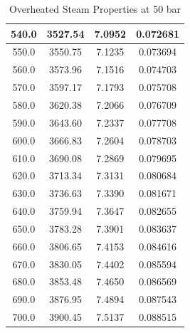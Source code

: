 \documentclass{article}
\begin{document}
\begin{table}[h!]
\begin{tabular}{|c|c|c|c|}
\hline
540.0 & 3527.54 & 7.0952 & 0.072681 \\
\hline
550.0 & 3550.75 & 7.1235 & 0.073694 \\
\hline
560.0 & 3573.96 & 7.1516 & 0.074703 \\
\hline
570.0 & 3597.17 & 7.1793 & 0.075708 \\
\hline
580.0 & 3620.38 & 7.2066 & 0.076709 \\
\hline
590.0 & 3643.60 & 7.2337 & 0.077708 \\
\hline
600.0 & 3666.83 & 7.2604 & 0.078703 \\
\hline
610.0 & 3690.08 & 7.2869 & 0.079695 \\
\hline
620.0 & 3713.34 & 7.3131 & 0.080684 \\
\hline
630.0 & 3736.63 & 7.3390 & 0.081671 \\
\hline
640.0 & 3759.94 & 7.3647 & 0.082655 \\
\hline
650.0 & 3783.28 & 7.3901 & 0.083637 \\
\hline
660.0 & 3806.65 & 7.4153 & 0.084616 \\
\hline
670.0 & 3830.05 & 7.4402 & 0.085594 \\
\hline
680.0 & 3853.48 & 7.4650 & 0.086569 \\
\hline
690.0 & 3876.95 & 7.4894 & 0.087543 \\
\hline
700.0 & 3900.45 & 7.5137 & 0.088515 \\
\hline

\end{tabular}
\caption{Overheated Steam Properties at 50 bar}
\end{table}
\end{document}
